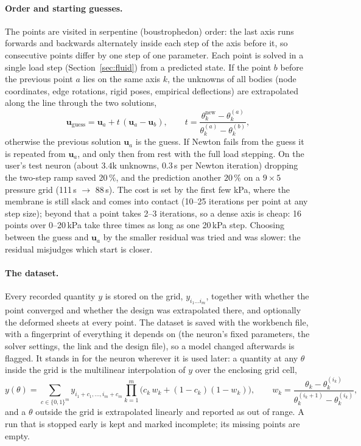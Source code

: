\documentclass[11pt,a4paper]{article}
\newcommand{\vect}[1]{\bm{#1}}
\newcommand{\uu}{\vect{u}}
\theoremstyle{remark}
\begin{document}
\paragraph{Order and starting guesses.} The points are visited in serpentine (boustrophedon) order:
the last axis runs forwards and backwards alternately inside each step of the axis before it, so
consecutive points differ by one step of one parameter. Each point is solved in a single load step
(Section~\ref{sec:fluid}) from a predicted state. If the point $b$ before the previous point $a$ lies
on the same axis $k$, the unknowns of all bodies (node coordinates, edge rotations, rigid poses,
empirical deflections) are extrapolated along the line through the two solutions,
\begin{equation}
\uu_{\text{guess}} = \uu_a + t\,(\uu_a - \uu_b), \qquad
t = \frac{\theta_k^{\text{new}} - \theta_k^{(a)}}{\theta_k^{(a)} - \theta_k^{(b)}},
\end{equation}
otherwise the previous solution $\uu_a$ is the guess. If Newton fails from the guess it is repeated
from $\uu_a$, and only then from rest with the full load stepping. On the user's test neuron (about
$3.4$k unknowns, $0.3$\,s per Newton iteration) dropping the two-step ramp saved $20\,\%$, and the
prediction another $20\,\%$ on a $9\times5$ pressure grid (111\,s $\to$ 88\,s). The cost is set by
the first few kPa, where the membrane is still slack and comes into contact (10--25 iterations per
point at any step size); beyond that a point takes 2--3 iterations, so a dense axis is cheap: 16
points over 0--20\,kPa take three times as long as one 20\,kPa step. Choosing between the guess and
$\uu_a$ by the smaller residual was tried and was slower: the residual misjudges which start is closer.

\paragraph{The dataset.} Every recorded quantity $y$ is stored on the
grid, $y_{i_1\dots i_m}$, together with whether the point converged and whether the design was
extrapolated there, and optionally the deformed sheets at every point. The dataset is saved with
the workbench file, with a fingerprint of everything it depends on (the neuron's fixed parameters,
the solver settings, the link and the design file), so a model changed afterwards is flagged. It
stands in for the neuron wherever it is used later: a quantity at any $\theta$ inside the grid is
the multilinear interpolation of $y$ over the enclosing grid cell,
\begin{equation}
y(\theta) = \sum_{c\in\{0,1\}^m} y_{i_1+c_1,\dots,i_m+c_m}\prod_{k=1}^m
\bigl(c_k\,w_k + (1-c_k)(1-w_k)\bigr), \qquad
w_k = \frac{\theta_k-\theta_k^{(i_k)}}{\theta_k^{(i_k+1)}-\theta_k^{(i_k)}},
\end{equation}
and a $\theta$ outside the grid is extrapolated linearly and reported as out of range. A run that
is stopped early is kept and marked incomplete; its missing points are empty.
\end{document}
